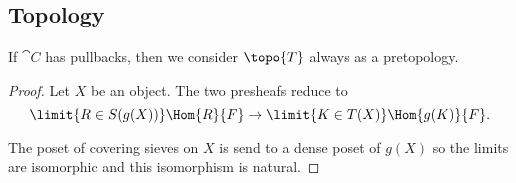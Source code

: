 \subsection{Topology}








If $\cat{C}$ has pullbacks, then we consider $\topo{T}$ always as a pretopology.


\begin{proof}
Let $X$ be an object.
The two presheafs reduce to
\[ \limit{R\in S(g(X))} \Hom{R}{F} \rightarrow \limit{K\in T(X)} \Hom{g(K)}{F}.\]

The poset of covering sieves on $X$ is send to a dense
poset of $g(X)$ so the limits are isomorphic and this isomorphism is natural.
\end{proof}